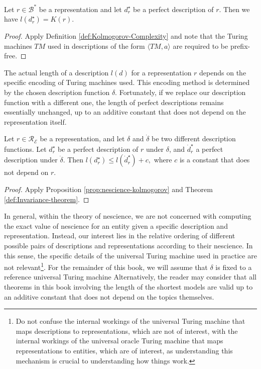 \begin{proposition}
\label{prop:nescience-kolmogorov}
Let $r \in \mathcal{B}^\ast$ be a representation and let $d_r^{\star}$ be a perfect description of $r$. Then we have $l \left( d_r^{\star} \right) = K\left( r \right)$.
\end{proposition}
\begin{proof}
Apply Definition \ref{def:Kolmogorov-Complexity} and note that the Turing machines $TM$ used in descriptions of the form $\langle TM, a \rangle$ are required to be prefix-free.
\end{proof}

The actual length of a description $l(d)$ for a representation $r$ depends on the specific encoding of Turing machines used. This encoding method is determined by the chosen description function $\delta$. Fortunately, if we replace our description function with a different one, the length of perfect descriptions remains essentially unchanged, up to an additive constant that does not depend on the representation itself.

\begin{corollary}
Let $r \in \mathcal{R}_\mathcal{E}$ be a representation, and let $\delta$ and $\dot{\delta}$ be two different description functions. Let $d_r^{\star}$ be a perfect description of $r$ under $\delta$, and $\dot{d}_r^{\star}$ a perfect description under $\dot{\delta}$. Then $l \left( d_r^{\star} \right) \leq l \left( \dot{d}_r^{\star} \right) + c,
$ where $c$ is a constant that does not depend on $r$.
\end{corollary}
\begin{proof}
Apply Proposition \ref{prop:nescience-kolmogorov} and Theorem \ref{def:Invariance-theorem}.
\end{proof}

In general, within the theory of nescience, we are not concerned with computing the exact value of nescience for an entity given a specific description and representation. Instead, our interest lies in the relative ordering of different possible pairs of descriptions and representations according to their nescience. In this sense, the specific details of the universal Turing machine used in practice are not relevant\footnote{Do not confuse the internal workings of the universal Turing machine that maps descriptions to representations, which are not of interest, with the internal workings of the universal oracle Turing machine that maps representations to entities, which are of interest, as understanding this mechanism is crucial to understanding how things work.}. For the remainder of this book, we will assume that $\delta$ is fixed to a reference universal Turing machine Alternatively, the reader may consider that all theorems in this book involving the length of the shortest models are valid up to an additive constant that does not depend on the topics themselves.

